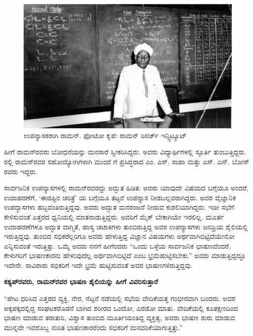 \begin{figure}[!htbp]
\centering
\includegraphics[scale=0.24]{"images/14.jpg"}
\caption{ಉಪನ್ಯಾಸಕರಾಗಿ ರಾಮನ್. ಫೋಟೋ ಕೃಪೆ: ರಾಮನ್‌ ರಿಸರ್ಚ್ ಇನ್ಸ್ಟಿಟ್ಯೂಟ್}\label{chap4-fig01}
\end{figure}

ಹೀಗೆ ರಾಮನ್‍ರವರು ಬೋಧನೆಯನ್ನು ಮನಸಾರೆ ಸ್ವೀಕರಿಸಿದ್ದರು. ಅವರು ವಿದ್ಯಾರ್ಥಿಗಳಲ್ಲಿ ಸ್ಫೂರ್ತಿ ತುಂಬುತ್ತಿದ್ದರು. ರಲ್ಲಿ ರಾಮನ್‍ರವರ ಸಹೋದ್ಯೋಗಿಗಳಾಗಿ ಮುಂದೆ  ಗೆ ಪ್ರಸಿದ್ಧರಾದ ಎಂ. ಎಸ್. ಸಾಹಾ ಮತ್ತು ಎಸ್. ಎನ್. ಬೋಸ್ ರವರು ಇದ್ದರು.



ಸಾರ್ವಜನಿಕ ಉಪನ್ಯಾಸಗಳಲ್ಲಿ ರಾಮನ್‍ರವರದ್ದು ಅದ್ಭುತ ಹಿಡಿತ. ಅವರು ಯಾವುದೇ ವಿಷಯದ ಬಗ್ಗೆಯೂ ಅಂದರೆ, ಉದಾಹರಣೆಗೆ, ‘ಈಜಿಪ್ಟಿನ ಚರಿತ್ರೆ’ ಯ ಬಗ್ಗೆಯೂ ತಟ್ಟನೆ ಉಪನ್ಯಾಸ ನೀಡಬಲ್ಲವರಾಗಿದ್ದರು. ಅವರ ವೈಜ್ಞಾನಿಕ ಉಪನ್ಯಾಸಗಳು ಹಬ್ಬದಂತಿರುತ್ತಿದ್ದವು. ಅವರು ಅದ್ಭುತ ಮನರಂಜನೆ ನೀಡುವ ಕುಶಲಿಯಾಗಿದ್ದರು. ಇಡೀ ಸಭೆಗೆ ಕೇಳಿಸುವಂತೆ ಎತ್ತರದ ಧ್ವನಿಯಲ್ಲಿ ಮಾತನಾಡುತ್ತಿದ್ದರು. ಅವರಿಗೆ ಮೈಕ್ ಬೇಕಾಗಿಯೇ ಇರಲಿಲ್ಲ. ಮೂರ್ತ ಉದಾಹರಣೆಗಳೂ ಅದ್ಭುತ ವಾಗ್ಮಿತೆ, ಹಾಸ್ಯ ಚಟಾಕಿಗಳು ತುಂಬಿರುತ್ತಿದ್ದ ಅವರ ಉಪನ್ಯಾಸಗಳು ಜನಪ್ರಿಯ ಶೈಲಿಯಲ್ಲಿ ಇರುತ್ತಿದ್ದವು. ತುಂಬಿದ ಸಭಿಕರೆಲ್ಲರಿಗೂ ಅವರು ಹೇಳುತ್ತಿದ್ದ ವಿಜ್ಞಾನ ವಿಷಯಗಳು ಅರ್ಥವಾಗಿ\break ಬಿಟ್ಟಿದೆಯೇನೋ ಎನ್ನಿಸುವಂತೆ ಇರುತ್ತಿತ್ತು. ಒಮ್ಮೆ ಅವರು ನನಗೆ ಹೀಗೆಂದರು “ಒಂದು ಒಳ್ಳೆಯ ಸಾರ್ವಜನಿಕ ಭಾಷಣವೆಂದರೆ, ಕೇಳುಗರಿಗೆ ಭಾಷಣಕಾರನು ಹೇಳುವುದೆಲ್ಲ ಅರ್ಥವಾಗಿಬಿಟ್ಟಿದೆ ಎಂಬ ಭ್ರಮೆಹುಟ್ಟಿಸಬೇಕು.” ಅವರು ಮಾಡುತ್ತಿದ್ದದ್ದೂ ಇದೇನೇ. ಸಾವಿರಾರು ಸಭಿಕರಿಗೆ ಇದೇ ಭ್ರಮೆ ಹುಟ್ಟಿಸುವಂತೆ ಅವರ ಭಾಷಣಗಳಿರುತ್ತಿದ್ದವು.

\vskip 2pt

\textbf{ಕಶ್ಯಪ್‍ರವರು, ರಾಮನ್‍ರವರ ಭಾಷಣ ಶೈಲಿಯನ್ನು ಹೀಗೆ ವಿವರಿಸುತ್ತಾರೆ}

\vskip 2pt

“ಪೇಟ ಧರಿಸಿದ ಎತ್ತರದ ವ್ಯಕ್ತಿ, ನೇರ, ನೆಟ್ಟನೆ ನಡೆಯಲ್ಲಿ ಸಭೆಯ ವೇದಿಕೆಯತ್ತ ಗಂಭೀರವಾಗಿ ಬಂದರು. ಅವರ ಅಕ್ಕಪಕ್ಕದಲ್ಲಿದ್ದ ಸಂಘಟಕರೊಡನೆ ಬಾಗಿದ ಶರೀರದ ಒಂದೋ, ಎರಡೋ ಮಾತು. ವೇದಿಕೆಯಲ್ಲಿ ಕೂತಕ್ಷಣದಿಂದ ಭಾಷಣ ಮಾಡುವ ತರಾತುರಿ, ವಿಶ್ವಾಸ ತುಂಬಿದ ಮೂರ್ತಿಯಂತಿದ್ದ ವ್ಯಕ್ತಿತ್ವ, ಅವರು ಭಾಷಣ ಶುರು ಮಾಡುವ ಮುನ್ನವೇ ಇವರೊಬ್ಬ ನುರಿತ ಭಾಷಣಕಾರರೆಂದು ಸಭಿಕರಿಗೆ ಮನವರಿಕೆಯಾಗುತ್ತಿತ್ತು.”

